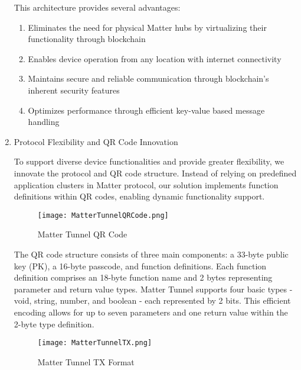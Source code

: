 \documentclass[conference]{IEEEtran}
\begin{document}
\begin{enumerate}[itemsep=2ex, parsep=1ex]
	      This architecture provides several advantages:
	      \begin{enumerate}[itemsep=2ex, parsep=1ex]
	      	\item Eliminates the need for physical Matter hubs by virtualizing their
	      	      functionality through blockchain
	      	      	      	      	      	      
	      	\item Enables device operation from any location with internet connectivity
	      	      	      	      	      	      
	      	\item Maintains secure and reliable communication through blockchain's inherent
	      	      security features
	      	      	      	      	      	      
	      	\item Optimizes performance through efficient key-value based message handling
	      \end{enumerate}
	      	      	      
	\item Protocol Flexibility and QR Code Innovation
	      	      	      
	      To support diverse device functionalities and provide greater flexibility, we innovate the protocol and QR code structure. Instead of relying on predefined application clusters in Matter protocol, our solution implements function definitions within QR codes, enabling dynamic functionality support.
	      	      	      
	      \begin{figure}[h!]
	      	\centering
	      	\texttt{[image: MatterTunnelQRCode.png]}
	      	\caption{Matter Tunnel QR Code}
	      	\label{fig:MatterTunnelQRCode}
	      \end{figure}
	      	      	      
	      The QR code structure consists of three main components: a 33-byte public key (PK), a 16-byte passcode, and function definitions. Each function definition comprises an 18-byte function name and 2 bytes representing parameter and return value types. Matter Tunnel supports four basic types - void, string, number, and boolean - each represented by 2 bits. This efficient encoding allows for up to seven parameters and one return value within the 2-byte type definition.
	      	      	      
	      \begin{figure}[h!]
	      	\centering
	      	\texttt{[image: MatterTunnelTX.png]}
	      	\caption{Matter Tunnel TX Format}
	      	\label{fig:MatterTunnelTXFormat}
	      \end{figure}
	      	      	      

\end{enumerate}
\end{document}
